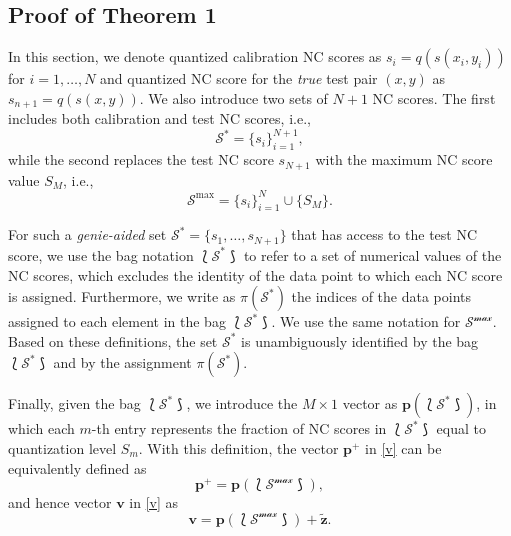 \documentclass[12pt, draftclsnofoot, onecolumn]{IEEEtran}
\begin{document}
\subsection{Proof of Theorem 1}\label{theorem1}
In this section, we denote quantized calibration NC scores as $s_i=q(s(x_i,y_i))$ for $i=1, \ldots, N$ and quantized NC score for the \textit{true} test pair $(x,y)$ as $s_{n+1}=q(s(x,y))$.
We also introduce two sets of $N+1$ NC scores. The first includes both calibration and test NC scores, i.e.,
\begin{equation}\label{set1}
    \mathcal{S}^*=\{s_i\}^{N+1}_{i=1},
\end{equation}
while the second replaces the test NC score $s_{N+1}$ with the maximum NC score value $S_M$, i.e., 
\begin{equation}\label{set2}
    \mathcal{S}^{\text{max}}=\{s_i\}^{N}_{i=1}\cup\{S_M\}.
\end{equation}

For such a \textit{genie-aided} set $\mathcal{S}^*=\{s_1,\ldots,s_{N+1}\}$ that has access to the test NC score, we use the bag notation $\lbag\mathcal{S}^*\rbag$ to refer to a set of numerical values of the NC scores, which excludes the identity of the data point to which each NC score is assigned. Furthermore, we write as $\pi(\mathcal{S}^*)$ the indices of the data points assigned to each element in the bag $\lbag\mathcal{S}^*\rbag$. We use the same notation for $\mathcal{S^{\text{max}}}$. Based on these definitions, the set $\mathcal{S}^*$ is unambiguously identified by the bag $\lbag\mathcal{S}^*\rbag$ and by the assignment $\pi(\mathcal{S}^*)$.

Finally, given the bag $\lbag\mathcal{S}^*\rbag$, we introduce the $M\times 1$ vector as $\boldsymbol{p}(\lbag\mathcal{S}^*\rbag)$, in which each $m$-th entry represents the fraction of NC scores in  $\lbag\mathcal{S}^*\rbag$ equal to quantization level $S_m$. With this definition, the vector $\boldsymbol{p}^+$ in \eqref{v} can be equivalently defined as
\begin{equation}\label{pbag}
    \boldsymbol{p}^+=\boldsymbol{p}(\lbag\mathcal{S^\text{max}}\rbag),
\end{equation}
and hence vector $\boldsymbol{v}$ in \eqref{v} as 
\begin{equation}\label{vbag}
    \boldsymbol{v}=\boldsymbol{p}(\lbag\mathcal{S^\text{max}}\rbag)+\tilde{\boldsymbol{z}}.
\end{equation}
\end{document}
